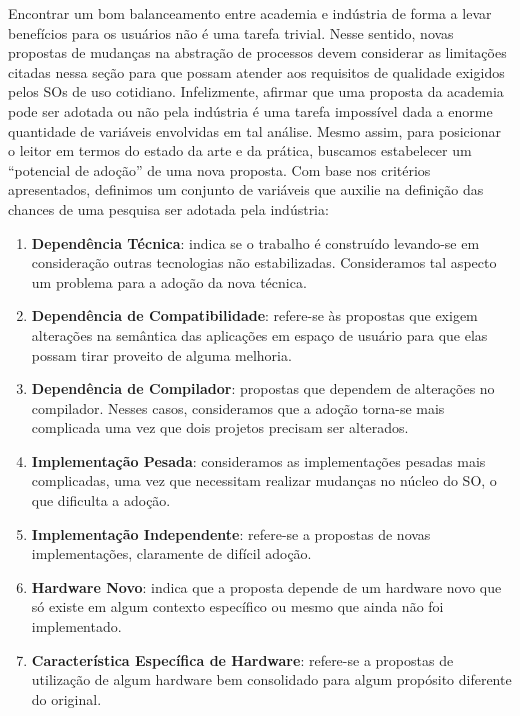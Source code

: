Encontrar um bom balanceamento entre academia e indústria de forma a levar
benefícios para os usuários não é uma tarefa trivial. Nesse sentido, novas
propostas de mudanças na abstração de processos devem considerar as limitações
citadas nessa seção para que possam atender aos requisitos de qualidade
exigidos pelos SOs de uso cotidiano. Infelizmente, afirmar que uma proposta da
academia pode ser adotada ou não pela indústria é uma tarefa impossível dada a
enorme quantidade de variáveis envolvidas em tal análise. Mesmo assim, para
posicionar o leitor em termos do estado da arte e da prática, buscamos
estabelecer um ``potencial de adoção'' de uma nova proposta. Com base nos
critérios apresentados, definimos um conjunto de variáveis que auxilie
na definição das chances de uma pesquisa ser adotada pela indústria:

\begin{enumerate}
  \item
\textbf{Dependência Técnica}: indica se o trabalho é construído
levando-se em consideração outras tecnologias não estabilizadas. Consideramos
tal aspecto um problema para a adoção da nova técnica.

  \item \textbf{Dependência de Compatibilidade}: refere-se às propostas que
exigem alterações na semântica das aplicações em espaço de usuário para que
elas possam tirar proveito de alguma melhoria.

  \item
\textbf{Dependência de Compilador}: propostas que dependem de alterações no
compilador. Nesses casos, consideramos que a adoção torna-se mais complicada
uma vez que dois projetos precisam ser alterados.

  \item
\textbf{Implementação Pesada}: consideramos as implementações pesadas mais
complicadas, uma vez que necessitam realizar mudanças no núcleo do SO, o que
dificulta a adoção.

  \item
\textbf{Implementação Independente}: refere-se a propostas de novas
implementações, claramente de difícil adoção.

  \item
\textbf{Hardware Novo}: indica que a proposta depende de um
hardware novo que só existe em algum contexto específico ou mesmo que ainda não
foi implementado.

  \item
\textbf{Característica Específica de Hardware}: refere-se a propostas de
utilização de algum hardware bem consolidado para algum propósito diferente do
original.

\end{enumerate}

